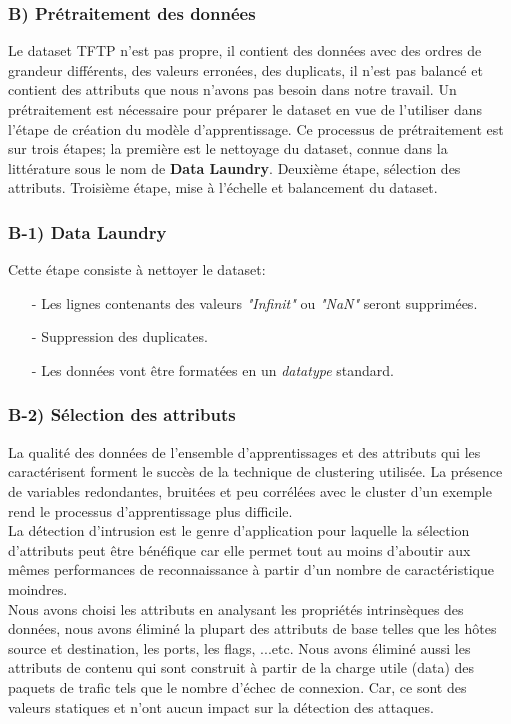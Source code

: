 \subsubsection{B) Prétraitement des données }
Le dataset TFTP n'est pas propre, il contient des données avec des ordres de grandeur différents, des valeurs erronées, des duplicats, il n'est pas balancé et contient des attributs que nous n'avons pas besoin dans notre travail. Un prétraitement est nécessaire pour préparer le dataset en vue de l'utiliser dans l'étape de création du modèle d'apprentissage. Ce processus de prétraitement est sur trois étapes; la première est le nettoyage du dataset, connue dans la littérature sous le nom de \textbf{Data Laundry}. Deuxième étape, sélection des attributs. Troisième étape, mise à l'échelle et balancement du dataset.

\subsubsection{B-1) Data Laundry}
Cette étape consiste à nettoyer le dataset:\\
\begin{itemize}
\item[-] Les lignes contenants des valeurs \textit{"Infinit"} ou \textit{"NaN"} seront supprimées.
\item[-] Suppression des duplicates.
\item[-] Les données vont être formatées en un \textit{datatype} standard.
\end{itemize}

\subsubsection{B-2) Sélection des attributs}
\label{attributs}
La qualité des données de l’ensemble d’apprentissages et des attributs qui les caractérisent forment le succès de la technique de clustering utilisée. La présence de variables redondantes, bruitées et peu corrélées avec le cluster d’un exemple rend le processus d’apprentissage plus difficile.\\

\noindent La détection d’intrusion est le genre d’application pour laquelle la sélection d’attributs peut être bénéfique car elle permet tout au moins d’aboutir aux mêmes performances de reconnaissance à partir d’un nombre de caractéristique moindres.\\

\noindent Nous avons choisi les attributs en analysant les propriétés intrinsèques des données, nous avons éliminé la plupart des attributs de base telles que  les hôtes source et destination, les ports, les flags, ...etc. Nous avons éliminé aussi les attributs de contenu qui sont construit à partir de la charge utile (data) des paquets de trafic tels que le nombre d’échec de connexion.  Car, ce sont des valeurs statiques et n’ont aucun impact sur la détection des attaques.\\

